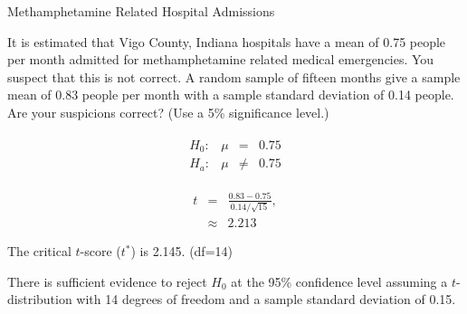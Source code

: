 \begin{frame}{Methamphetamine Related Hospital Admissions}

  It is estimated that Vigo County, Indiana hospitals have a mean of
  0.75 people per month admitted for methamphetamine related medical
  emergencies. You suspect that this is not correct. A random sample
  of fifteen months give a sample mean of 0.83 people per month with a
  {\color{red}sample standard deviation} of 0.14 people. Are your
  suspicions correct?  (Use a 5\% significance level.)

  {
    \begin{eqnarray*}
      \begin{array}{lrcl}
        H_0: & \mu & = & 0.75 \\
        H_a: & \mu & \neq & 0.75
      \end{array}
    \end{eqnarray*}
  }

  {
    \begin{eqnarray*}
      t & = & \frac{0.83-0.75}{0.14/\sqrt{15}}, \\
      & \approx & 2.213
    \end{eqnarray*}
  }

  {
    The critical $t$-score ($t^*$) is 2.145. (df=14)
  }

  {

    {\color{red}
      There is sufficient evidence to reject $H_0$ at the 95\%
      confidence level assuming a $t$-distribution with 14 degrees of
      freedom and a {\color{red}sample standard deviation} of 0.15.
    }

  }

  
\end{frame}





